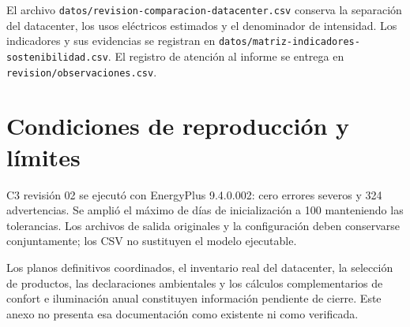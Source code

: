 El archivo \nolinkurl{datos/revision-comparacion-datacenter.csv} conserva la separación del datacenter, los usos eléctricos estimados y el denominador de intensidad. Los indicadores y sus evidencias se registran en \nolinkurl{datos/matriz-indicadores-sostenibilidad.csv}. El registro de atención al informe se entrega en \nolinkurl{revision/observaciones.csv}.
\section{Condiciones de reproducción y límites}
C3 revisión 02 se ejecutó con EnergyPlus 9.4.0.002: cero errores severos y 324 advertencias. Se amplió el máximo de días de inicialización a 100 manteniendo las tolerancias. Los archivos de salida originales y la configuración deben conservarse conjuntamente; los CSV no sustituyen el modelo ejecutable.

Los planos definitivos coordinados, el inventario real del datacenter, la selección de productos, las declaraciones ambientales y los cálculos complementarios de confort e iluminación anual constituyen información pendiente de cierre. Este anexo no presenta esa documentación como existente ni como verificada.

